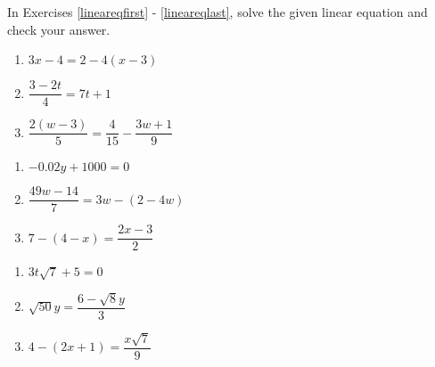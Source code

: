 \documentclass{ximera}
\begin{document}
	\author{Stitz-Zeager}



\label{ExercisesforAppLinearEqIneq}

In Exercises \ref{lineareqfirst} - \ref{lineareqlast}, solve the given linear equation and check your answer.  


\begin{multicols}{3}
\begin{enumerate}

\item $3x - 4 = 2 - 4(x-3)$\label{lineareqfirst} 
\item $\dfrac{3 - 2t}{4} = 7t+1$

\item  $\dfrac{2(w-3)}{5} = \dfrac{4}{15} - \dfrac{3w+1}{9}$ 

\setcounter{HW}{\value{enumi}}
\end{enumerate}
\end{multicols}

\begin{multicols}{3}
\begin{enumerate}
\setcounter{enumi}{\value{HW}}

\item  $-0.02y + 1000 = 0$  
\item  $\dfrac{49w - 14}{7}= 3w - (2-4w)$ 
\item  $7 - (4-x) = \dfrac{2x-3}{2}$  

\setcounter{HW}{\value{enumi}}
\end{enumerate}
\end{multicols}


\begin{multicols}{3}
\begin{enumerate}
\setcounter{enumi}{\value{HW}}

\item $3 t\sqrt{7}  + 5 = 0$  

\item  $\sqrt{50} y = \dfrac{6 - \sqrt{8} y}{3}$  

\item  $4 - (2x+1) = \dfrac{x \sqrt{7}}{9}$ \label{lineareqlast} 

\setcounter{HW}{\value{enumi}}
\end{enumerate}
\end{multicols}
\end{document}
